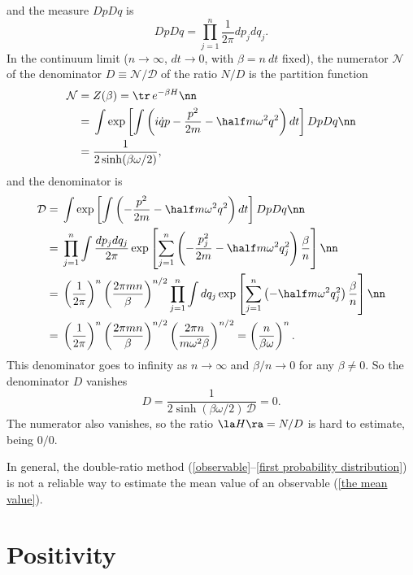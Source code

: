\documentclass[prd,preprint,floatfix,showpacs]{revtex4-1}
\begin{document}
and the measure \( Dp Dq \) is
\begin{equation}
Dp Dq = \prod_{j=1}^n \frac{1}{2\pi} dp_j dq_j .
\label {Dp Dq}
\end{equation}
In the continuum limit 
($n\rightarrow\infty$, $dt\rightarrow 0$, with $\beta = n\:dt$ fixed),
the numerator \( \mathcal{N} \)
of the denominator \( D \equiv \mathcal{N} / \mathcal{D} \) 
of the ratio \( N/D \)
is the partition function 
\begin{align}
\mathcal{N} = {}& Z(\beta) = \tr \, e^{-\beta H} \nn\\
= {}& \int \exp\left[ \int \left( i \dot q p - \frac{p^2}{2m}
   - \half m \omega^2 q^2 \right) dt \right] Dp Dq \nn\\
= {}& \frac{1}{2 \sinh (\beta \omega/2)} ,
   \label {The numerator of this expression is}
\end{align}
and the denominator is
\begin{align} 
\mathcal{D} ={}& 
\int \exp \left[ \int  \left( - \frac{p^2}{2m}
   - \half m \omega^2 q^2 \right) dt \right]  
   Dp Dq \nn  \\
   ={}& \prod_{j=1}^n \int  \frac{dp_j dq_j}{2\pi}
   \exp \left[ \sum_{j=1}^n \left( - \frac{p^2_j}{2m}
   - \half m \omega^2 q^2_j \right) \frac{\beta}{n}
    \right] \nn  \\
   ={}& \left(\frac{1}{2\pi}\right)^n
   \left(\frac{2\pi m n}{\beta} \right)^{n/2}
 \prod_{j=1}^n \int dq_j 
   \exp \left[ \sum_{j=1}^n  \left( 
      - \half m \omega^2 q^2_j \right) \frac{\beta}{n}
       \right] \nn  \\  
 ={}& \left(\frac{1}{2\pi}\right)^n
 \left(\frac{2\pi m n}{\beta} \right)^{n/2}   
\left(\frac{2\pi n}{m \omega^2 \beta} \right)^{n/2}    
= \left( \frac{n}{\beta \omega} \right)^n  .
  \end{align}
This denominator goes to infinity as \( n \to \infty \) and 
\( \beta/n \to 0 \) for any \( \beta \ne 0 \)\@.
So the denominator \( D \) vanishes
\begin{equation}
D =  \frac{1}{2 \sinh (\beta \omega/2) \, 
\mathcal{D}} = 0 .
\label {So the denominator =0}
\end{equation}
The numerator also vanishes,
so the ratio \( \la H \ra = N/D \)
is hard to estimate, being \( 0 /0 \)\@.
\par
In general, the double-ratio method
(\ref {observable}--\ref {first probability distribution})
is not a reliable way to estimate the mean value
of an observable (\ref {the mean value})\@.

\section{Positivity
\label {Positivity}}
\end{document}
